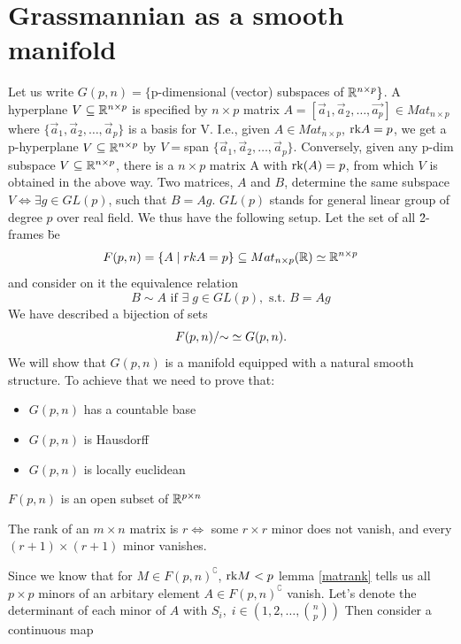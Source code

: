 \documentclass[11pt,a4paper]{report}
\begin{document}
\section{Grassmannian as a smooth manifold}\label{Gr_smooth}
Let us write $G(p,n) = \{ $p-dimensional (vector) subspaces of $\mathbb{R}^{n \times p} \}$. A hyperplane $V \subseteq \mathbb{R}^{n \times p}$ is specified by $n \times p$ matrix $A=[\vec{a}_1,\vec{a}_2, \dots, \vec{a_p}] \in Mat_{n\times p}$ where 
$\{\vec{a}_1, \vec{a}_2, \dots , \vec{a}_p \}$ is a basis for V. I.e., given $A \in Mat_{n\times p}$, $\textrm{rk} A = p$, we get a p-hyperplane $V \subseteq \mathbb{R}^{n \times p}$ by $V= $span $\{\vec{a}_1,\vec{a}_2, \dots, \vec{a}_p \} $. Conversely, given any p-dim subspace $V\subseteq \mathbb{R}^{n \times p}$, there is a $n \times p$
matrix A with $\textrm{rk}(A)=p$, from which $V$ is obtained in the above way. Two matrices, $A$ and $B$, determine the same subspace $V \iff \exists g \in GL(p) $, such that $B = A g$. $GL(p)$ stands for general linear group of degree $p$ over real field.
\newline
We thus have the following setup. Let the set of all \" 2-frames \" be
$$ F(p,n) = \{ A \; | \;  rkA=p \} \subseteq Mat_{n \times p}(\mathbb{R})  \simeq \mathbb{R}^{n \times p} $$
and consider on it the equivalence relation
$$ B \sim A \text{ if } \exists \; g \in GL(p), \text{ s.t. } B=Ag $$
We have described a bijection of sets
$$ F(p,n)/{\sim} \simeq  G(p,n). $$ 
We will show that $G(p,n)$ is a manifold equipped with a natural smooth structure. To achieve that we need to prove that:
\begin{itemize}
    \item $G(p,n)$ has a countable base
    \item $G(p,n)$ is Hausdorff
    \item $G(p,n)$ is locally euclidean
\end{itemize}
\begin{Prop}
    $F(p,n)$ is an open subset of $\mathbb{R}^{p \times n}$
\end{Prop}
\begin{Lemma}\label{matrank}
    The rank of an $m \times n$ matrix is $r \iff$ some $r \times r$ minor does not vanish,
    and every $(r+1) \times (r+1)$ minor vanishes.
\end{Lemma}
Since we know that for $M \in F(p,n)^\complement$, $\textrm{rk} M <p$ lemma \ref{matrank} tells us all $p \times p$ minors
of an arbitary element $ A \in F(p,n)^\complement$ vanish. Let's denote the determinant of each minor of $A$ with $S_i, \; i\in (1,2, \dots ,  {n \choose p})$ 
Then consider a continuous map
\end{document}
